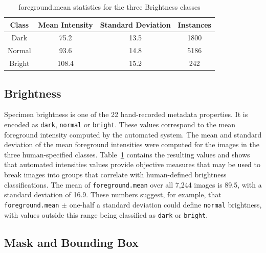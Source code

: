 \documentclass[conference]{IEEEtran}
\begin{document}
\begin{table}[H]
    \centering
    \caption{foreground.mean statistics for the three Brightness classes}
    \label{tab:bright}
    \begin{tabular}{cccc}
        \toprule
        \textbf{Class} & \textbf{Mean Intensity} & \textbf{Standard Deviation} & \textbf{Instances}\\
        \midrule
        Dark & 75.2 & 13.5 & 1800\\
        Normal & 93.6 & 14.8 & 5186\\
        Bright & 108.4 & 15.2 & 242\\
        \bottomrule
    \end{tabular}
\end{table}
\subsection{Brightness}
Specimen brightness is one of the 22 hand-recorded metadata properties. It is encoded as \verb|dark|, \verb|normal| or \verb|bright|. These values
correspond to the mean foreground intensity computed by the automated system.
The mean and standard deviation of the mean foreground intensities were
computed for the images in the three human-specified classes.
Table~\ref{tab:bright} contains the resulting values and shows that
automated intensities values provide objective measures that may be used to break images into groups that correlate with human-defined brightness
classifications.
The mean of \verb|foreground.mean| over all 7,244 images is 89.5, with a
standard deviation of 16.9. These numbers suggest, for example, that
\verb|foreground.mean| $\pm$ one-half a standard deviation could define 
\verb|normal| brightness, with values outside this range being classified
as \verb|dark| or \verb|bright|.


\subsection{Mask and Bounding Box}
\end{document}
